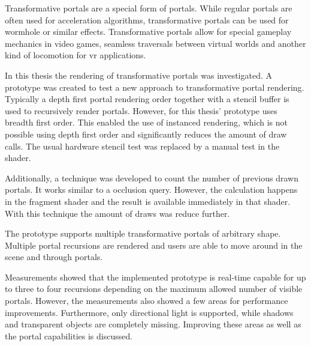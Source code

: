 
Transformative portals are a special form of portals. While regular portals are often used for acceleration algorithms, transformative portals can be used for wormhole or similar effects. Transformative portals allow for special gameplay mechanics in video games, seamless traversals between virtual worlds and another kind of locomotion for \gls{vr} applications.

In this thesis the rendering of transformative portals was investigated. A prototype was created to test a new approach to transformative portal rendering. Typically a depth first portal rendering order together with a stencil buffer is used to recursively render portals. However, for this thesis' prototype uses breadth first order. This enabled the use of instanced rendering, which is not possible using depth first order and significantly reduces the amount of draw calls. The usual hardware stencil test was replaced by a manual test in the shader.

Additionally, a technique was developed to count the number of previous drawn portals. It works similar to a occlusion query. However, the calculation happens in the fragment shader and the result is available immediately in that shader. With this technique the amount of draws was reduce further.

The prototype supports multiple transformative portals of arbitrary shape. Multiple portal recursions are rendered and users are able to move around in the scene and through portals.

Measurements showed that the implemented prototype is real-time capable for up to three to four recursions depending on the maximum allowed number of visible portals. However, the measurements also showed a few areas for performance improvements. Furthermore, only directional light is supported, while shadows and transparent objects are completely missing. Improving these areas as well as the portal capabilities is discussed.
